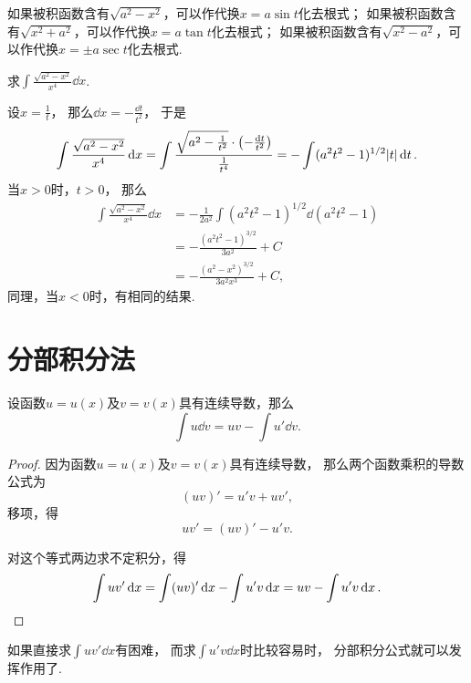 \begin{remark}
如果被积函数含有\(\sqrt{a^2 - x^2}\)，可以作代换\(x = a \sin t\)化去根式；
如果被积函数含有\(\sqrt{x^2 + a^2}\)，可以作代换\(x=a \tan t\)化去根式；
如果被积函数含有\(\sqrt{x^2 - a^2}\)，可以作代换\(x=\pm a \sec t\)化去根式.
\end{remark}

\begin{example}
求\(\int \frac{\sqrt{a^2 - x^2}}{x^4} \dd{x}\).
\begin{solution}
设\(x = \frac{1}{t}\)，
那么\(\dd{x} = -\frac{\dd{t}}{t^2}\)，
于是\[
	\int \frac{\sqrt{a^2 - x^2}}{x^4} \dd{x}
	= \int \frac{\sqrt{a^2 - \frac{1}{t^2}} \cdot \left( -\frac{\dd{t}}{t^2} \right)}{\frac{1}{t^4}}
	= -\int (a^2 t^2 - 1)^{1/2} \abs{t} \dd{t}.
\]
当\(x > 0\)时，\(t > 0\)，
那么\begin{align*}
	\int \frac{\sqrt{a^2 - x^2}}{x^4} \dd{x}
	&= -\frac{1}{2a^2} \int (a^2 t^2 - 1)^{1/2} \dd(a^2 t^2 - 1) \\
	&= -\frac{(a^2 t^2 - 1)^{3/2}}{3 a^2} + C \\
	&= -\frac{(a^2 - x^2)^{3/2}}{3 a^2 x^3} + C,
\end{align*}
同理，当\(x < 0\)时，有相同的结果.
\end{solution}
\end{example}

\section{分部积分法}
\begin{theorem}[分部积分公式]
设函数\(u=u(x)\)及\(v=v(x)\)具有连续导数，那么\[
	\int u \dd{v} = uv - \int u' \dd{v}.
\]
\begin{proof}
因为函数\(u=u(x)\)及\(v=v(x)\)具有连续导数，
那么两个函数乘积的导数公式为\[
	(uv)' = u'v + uv',
\]
移项，得\[
	uv' = (uv)' - u'v.
\]

对这个等式两边求不定积分，得\[
	\int u v' \dd{x} = \int (uv)' \dd{x} - \int u' v \dd{x}
	= uv - \int u' v \dd{x}.
	\qedhere
\]
\end{proof}
\end{theorem}
如果直接求\(\int u v' \dd{x}\)有困难，
而求\(\int u' v \dd{x}\)时比较容易时，
分部积分公式就可以发挥作用了.

